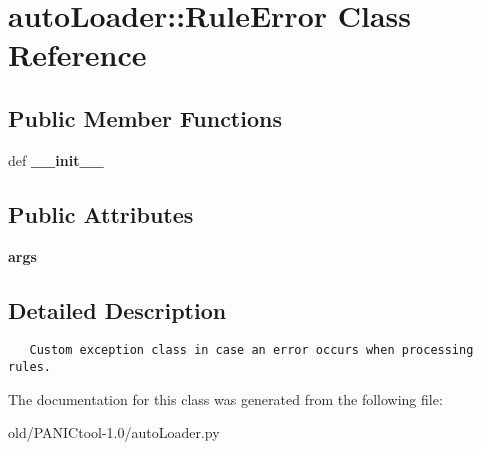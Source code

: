 \section{auto\-Loader::Rule\-Error Class Reference}
\label{classautoLoader_1_1RuleError}
\subsection*{Public Member Functions}
\begin{CompactItemize}
\item 
def \textbf{\_\-\_\-init\_\-\_\-}\label{classautoLoader_1_1RuleError_b82578e09cdc5608563d4ab1c9d46479}

\end{CompactItemize}
\subsection*{Public Attributes}
\begin{CompactItemize}
\item 
\textbf{args}\label{classautoLoader_1_1RuleError_7e4954219f8e9ca3497facceb67acf47}

\end{CompactItemize}


\subsection{Detailed Description}


\footnotesize\begin{verbatim}
   Custom exception class in case an error occurs when processing rules.
\end{verbatim}
\normalsize
 



The documentation for this class was generated from the following file:\begin{CompactItemize}
\item 
old/PANICtool-1.0/auto\-Loader.py\end{CompactItemize}
